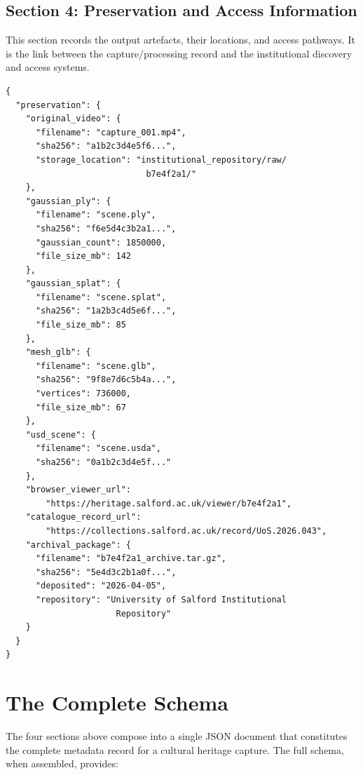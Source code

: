 \subsection{Section 4: Preservation and Access Information}

This section records the output artefacts, their locations, and access pathways. It is the link between the capture/processing record and the institutional discovery and access systems.

\begin{lstlisting}[language={}, caption={Preservation and access metadata section.}, label={lst:meta-preservation}]
{
  "preservation": {
    "original_video": {
      "filename": "capture_001.mp4",
      "sha256": "a1b2c3d4e5f6...",
      "storage_location": "institutional_repository/raw/
                            b7e4f2a1/"
    },
    "gaussian_ply": {
      "filename": "scene.ply",
      "sha256": "f6e5d4c3b2a1...",
      "gaussian_count": 1850000,
      "file_size_mb": 142
    },
    "gaussian_splat": {
      "filename": "scene.splat",
      "sha256": "1a2b3c4d5e6f...",
      "file_size_mb": 85
    },
    "mesh_glb": {
      "filename": "scene.glb",
      "sha256": "9f8e7d6c5b4a...",
      "vertices": 736000,
      "file_size_mb": 67
    },
    "usd_scene": {
      "filename": "scene.usda",
      "sha256": "0a1b2c3d4e5f..."
    },
    "browser_viewer_url":
        "https://heritage.salford.ac.uk/viewer/b7e4f2a1",
    "catalogue_record_url":
        "https://collections.salford.ac.uk/record/UoS.2026.043",
    "archival_package": {
      "filename": "b7e4f2a1_archive.tar.gz",
      "sha256": "5e4d3c2b1a0f...",
      "deposited": "2026-04-05",
      "repository": "University of Salford Institutional
                      Repository"
    }
  }
}
\end{lstlisting}

\section{The Complete Schema}
\label{sec:meta-complete}

The four sections above compose into a single JSON document that constitutes the complete metadata record for a cultural heritage capture. The full schema, when assembled, provides:

